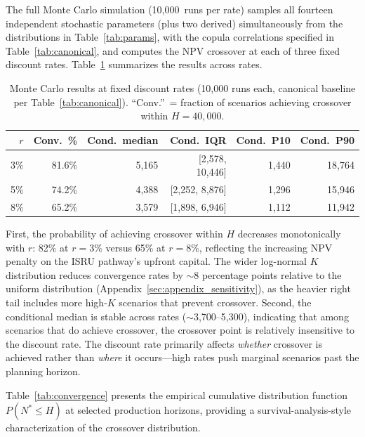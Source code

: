 \documentclass[preprint,12pt]{elsarticle}
\begin{document}
The full Monte Carlo simulation (10{,}000~runs per rate) samples all fourteen independent stochastic parameters (plus two derived) simultaneously from the distributions in Table~\ref{tab:params}, with the copula correlations specified in Table~\ref{tab:canonical}, and computes the NPV crossover at each of three fixed discount rates. Table~\ref{tab:mc_summary} summarizes the results across rates.

\begin{table}[htbp]
\centering
\caption{Monte Carlo results at fixed discount rates (10{,}000 runs each, canonical baseline per Table~\ref{tab:canonical}). ``Conv.''\ = fraction of scenarios achieving crossover within $H = 40{,}000$.}
\label{tab:mc_summary}
\small
\begin{tabular}{@{}rrrrrr@{}}
\toprule
$r$ & Conv.\ \% & Cond.\ median & Cond.\ IQR & Cond.\ P10 & Cond.\ P90 \\
\midrule
3\%  & 81.6\% & 5{,}165 & [2{,}578, 10{,}446] & 1{,}440 & 18{,}764 \\
5\%  & 74.2\% & 4{,}388 & [2{,}252, 8{,}876]  & 1{,}296 & 15{,}946 \\
8\%  & 65.2\% & 3{,}579 & [1{,}898, 6{,}946]  & 1{,}112 & 11{,}942 \\
\bottomrule
\end{tabular}
\end{table}

First, the probability of achieving crossover within $H$ decreases monotonically with $r$: 82\% at $r = 3\%$ versus 65\% at $r = 8\%$, reflecting the increasing NPV penalty on the ISRU pathway's upfront capital. The wider log-normal $K$ distribution reduces convergence rates by $\sim$8 percentage points relative to the uniform distribution (Appendix~\ref{sec:appendix_sensitivity}), as the heavier right tail includes more high-$K$ scenarios that prevent crossover. Second, the conditional median is stable across rates ($\sim$3{,}700--5{,}300), indicating that among scenarios that do achieve crossover, the crossover point is relatively insensitive to the discount rate. The discount rate primarily affects \emph{whether} crossover is achieved rather than \emph{where} it occurs---high rates push marginal scenarios past the planning horizon.

Table~\ref{tab:convergence} presents the empirical cumulative distribution function $P(N^* \leq H)$ at selected production horizons, providing a survival-analysis-style characterization of the crossover distribution.
\end{document}
